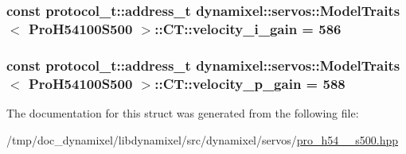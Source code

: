 \subsubsection[{\texorpdfstring{velocity\+\_\+i\+\_\+gain}{velocity_i_gain}}]{\setlength{\rightskip}{0pt plus 5cm}const {\bf protocol\+\_\+t\+::address\+\_\+t} {\bf dynamixel\+::servos\+::\+Model\+Traits}$<$ {\bf Pro\+H54100\+S500} $>$\+::C\+T\+::velocity\+\_\+i\+\_\+gain = 586\hspace{0.3cm}{\ttfamily [static]}}\hypertarget{structdynamixel_1_1servos_1_1_model_traits_3_01_pro_h54100_s500_01_4_1_1_c_t_aa9f95ecabd3a6e81786d55cd5fc6d01d}{}\label{structdynamixel_1_1servos_1_1_model_traits_3_01_pro_h54100_s500_01_4_1_1_c_t_aa9f95ecabd3a6e81786d55cd5fc6d01d}
\subsubsection[{\texorpdfstring{velocity\+\_\+p\+\_\+gain}{velocity_p_gain}}]{\setlength{\rightskip}{0pt plus 5cm}const {\bf protocol\+\_\+t\+::address\+\_\+t} {\bf dynamixel\+::servos\+::\+Model\+Traits}$<$ {\bf Pro\+H54100\+S500} $>$\+::C\+T\+::velocity\+\_\+p\+\_\+gain = 588\hspace{0.3cm}{\ttfamily [static]}}\hypertarget{structdynamixel_1_1servos_1_1_model_traits_3_01_pro_h54100_s500_01_4_1_1_c_t_a8cf1be6d7590af17d609b4df627a620d}{}\label{structdynamixel_1_1servos_1_1_model_traits_3_01_pro_h54100_s500_01_4_1_1_c_t_a8cf1be6d7590af17d609b4df627a620d}


The documentation for this struct was generated from the following file\+:\begin{DoxyCompactItemize}
\item 
/tmp/doc\+\_\+dynamixel/libdynamixel/src/dynamixel/servos/\hyperlink{pro__h54__100__s500_8hpp}{pro\+\_\+h54\+\_\+\_\+s500.\+hpp}\end{DoxyCompactItemize}
